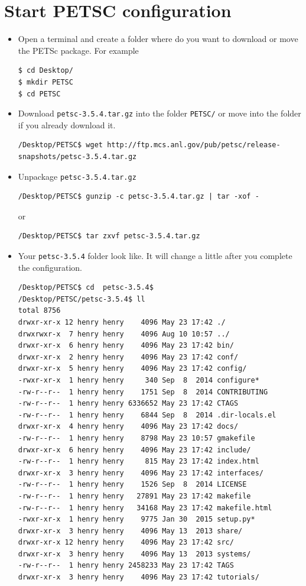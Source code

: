 \documentclass{article}
\begin{document}
\section{Start PETSC configuration}
\begin{itemize}
 \item Open a terminal and create a folder where do you want to download or move the PETSc package. For example
\scriptsize
\begin{verbatim}
$ cd Desktop/
$ mkdir PETSC
$ cd PETSC
\end{verbatim}
\normalsize
\item Download \verb+petsc-3.5.4.tar.gz+ into the folder \verb+PETSC/+ or move into the folder if you already download it.
\scriptsize
\begin{verbatim}
/Desktop/PETSC$ wget http://ftp.mcs.anl.gov/pub/petsc/release-snapshots/petsc-3.5.4.tar.gz
\end{verbatim} 
\normalsize
\item Unpackage  \verb+petsc-3.5.4.tar.gz+ 
\scriptsize
\begin{verbatim}
/Desktop/PETSC$ gunzip -c petsc-3.5.4.tar.gz | tar -xof -
\end{verbatim}
\normalsize
or 
\scriptsize
\begin{verbatim}
/Desktop/PETSC$ tar zxvf petsc-3.5.4.tar.gz
\end{verbatim}
\normalsize
\item Your \verb+petsc-3.5.4+ folder look like. It will change a little after you complete the configuration.
\scriptsize
\begin{verbatim}
/Desktop/PETSC$ cd  petsc-3.5.4$
/Desktop/PETSC/petsc-3.5.4$ ll
total 8756
drwxr-xr-x 12 henry henry    4096 May 23 17:42 ./
drwxrwxr-x  7 henry henry    4096 Aug 10 10:57 ../
drwxr-xr-x  6 henry henry    4096 May 23 17:42 bin/
drwxr-xr-x  2 henry henry    4096 May 23 17:42 conf/
drwxr-xr-x  5 henry henry    4096 May 23 17:42 config/
-rwxr-xr-x  1 henry henry     340 Sep  8  2014 configure*
-rw-r--r--  1 henry henry    1751 Sep  8  2014 CONTRIBUTING
-rw-r--r--  1 henry henry 6336652 May 23 17:42 CTAGS
-rw-r--r--  1 henry henry    6844 Sep  8  2014 .dir-locals.el
drwxr-xr-x  4 henry henry    4096 May 23 17:42 docs/
-rw-r--r--  1 henry henry    8798 May 23 10:57 gmakefile
drwxr-xr-x  6 henry henry    4096 May 23 17:42 include/
-rw-r--r--  1 henry henry     815 May 23 17:42 index.html
drwxr-xr-x  3 henry henry    4096 May 23 17:42 interfaces/
-rw-r--r--  1 henry henry    1526 Sep  8  2014 LICENSE
-rw-r--r--  1 henry henry   27891 May 23 17:42 makefile
-rw-r--r--  1 henry henry   34168 May 23 17:42 makefile.html
-rwxr-xr-x  1 henry henry    9775 Jan 30  2015 setup.py*
drwxr-xr-x  3 henry henry    4096 May 13  2013 share/
drwxr-xr-x 12 henry henry    4096 May 23 17:42 src/
drwxr-xr-x  3 henry henry    4096 May 13  2013 systems/
-rw-r--r--  1 henry henry 2458233 May 23 17:42 TAGS
drwxr-xr-x  3 henry henry    4096 May 23 17:42 tutorials/
\end{verbatim}
\normalsize
\end{itemize}
\end{document}
